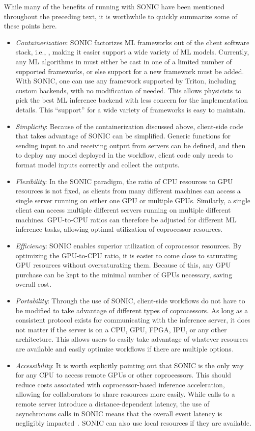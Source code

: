 While many of the benefits of running with SONIC have been mentioned throughout the preceding text, it is worthwhile to quickly summarize some of these points here.
\begin{itemize}
    \item \emph{Containerization}: SONIC factorizes ML frameworks out of the client software stack, i.e., \CMSSW, making it easier support a wide variety of ML models. Currently, any ML algorithms in \CMSSW must either be cast in one of a limited number of supported frameworks, or else support for a new framework must be added. With SONIC, one can use any framework supported by Triton, including custom backends, with no modification of \CMSSW needed. This allows physicists to pick the best ML inference backend with less concern for the implementation details. This ``support'' for a wide variety of frameworks is easy to maintain.
    \item \emph{Simplicity}: Because of the containerization discussed above, client-side code that takes advantage of SONIC can be simplified. Generic functions for sending input to and receiving output from servers can be defined, and then to deploy any model deployed in the workflow, client code only needs to format model inputs correctly and collect the outputs.
    \item \emph{Flexibility}: In the SONIC paradigm, the ratio of CPU resources to GPU resources is not fixed, as clients from many different machines can access a single server running on either one GPU or multiple GPUs. Similarly, a single client can access multiple different servers running on multiple different machines. GPU-to-CPU ratios can therefore be adjusted for different ML inference tasks, allowing optimal utilization of coprocessor resources.
    \item \emph{Efficiency}: SONIC enables superior utilization of coprocessor resources. By optimizing the GPU-to-CPU ratio, it is easier to come close to saturating GPU resources without oversaturating them. Because of this, any GPU purchase can be kept to the minimal number of GPUs necessary, saving overall cost.
    \item \emph{Portability}: Through the use of SONIC, client-side workflows do not have to be modified to take advantage of different types of coprocessors. As long as a consistent protocol exists for communicating with the inference server, it does not matter if the server is on a CPU, GPU, FPGA, IPU, or any other architecture. This allows users to easily take advantage of whatever resources are available and easily optimize workflows if there are multiple options.
    \item \emph{Accessibility}: It is worth explicitly pointing out that SONIC is the only way for any CPU to access remote GPUs or other coprocessors. This should reduce costs associated with coprocessor-based inference acceleration, allowing for collaborators to share resources more easily. While calls to a remote server introduce a distance-dependent latency, the use of asynchronous calls in SONIC means that the overall event latency is negligibly impacted~\cite{Krupa:2020bwg}. SONIC can also use local resources if they are available.
\end{itemize}
